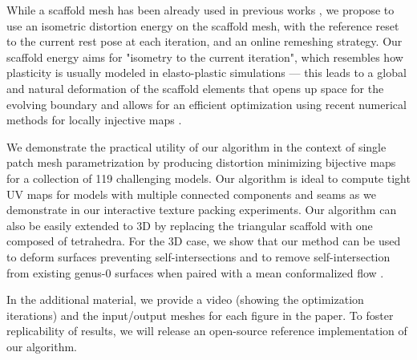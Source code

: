 {While a scaffold mesh has been already used in previous works \cite{Zhang:2005,Misztal:2012,Muller:2015}, we propose to use an isometric distortion energy on the scaffold mesh, with the reference reset to the current rest pose at each iteration, and an online remeshing strategy. Our scaffold energy aims for "isometry to the current iteration", which resembles how plasticity is usually modeled in elasto-plastic simulations --- this leads to a global and natural deformation of the scaffold elements that opens up space for the evolving boundary and allows for an efficient optimization using recent numerical methods for locally injective maps \cite{rabinovich2017scalable}.}

We demonstrate the practical utility of our algorithm in the context of single patch mesh parametrization by producing distortion minimizing bijective maps for a collection of {119} challenging models. Our algorithm is ideal to compute tight UV maps for models with multiple connected components and seams as we demonstrate in our interactive texture packing experiments. Our algorithm can also be easily extended to 3D by replacing the triangular scaffold with one composed of tetrahedra. For the 3D case, we show that our method can be used to deform surfaces preventing self-intersections and to remove self-intersection from existing genus-0 surfaces when paired with a mean conformalized flow \cite{Kazhdan:2012,Sacht:2013}.

In the additional material, we provide a video (showing the optimization iterations) and the input/output meshes for each figure in the paper. To foster replicability of results, we will release an open-source reference implementation of our algorithm. 

